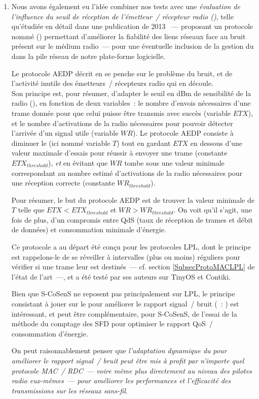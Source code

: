 \begin{enumerate}
\item Nous avons également eu l'idée combiner nos tests avec une
\emph{évaluation de l'influence du seuil de réception de l'émetteur~/
récepteur radio ()}, telle qu'étudiée en détail
dans une publication de 2013 \cite{CCAThresholdStudy}~--- proposant un
protocole nommé  ()
permettant d'améliorer la fiabilité des liens réseaux face au bruit
présent sur le médium radio~--- pour une éventuelle inclusion de la
gestion du  dans la pile réseau de notre
plate-forme logicielle.

Le protocole AEDP décrit en \cite{CCAThresholdStudy} se penche sur
le problème du bruit, et de l'activité inutile des émetteurs~/ récepteurs
radio qui en découle.\\
Son principe est, pour résumer, d'adapter le seuil en dBm de sensibilité
de la radio (), en fonction de deux variables~:
le nombre d'envois nécessaires d'une trame donnée pour que celui puisse
être transmis avec succès (variable ${ETX}$), et le nombre d'activations
de la radio nécessaires pour pouvoir détecter l'arrivée d'un signal utile
(variable ${WR}$). Le protocole AEDP consiste à diminuer le  (ici nommé variable $T$) tout en gardant $ETX$ en dessous
d'une valeur maximale d'essais pour réussir à envoyer une trame (constante
${ETX}_{threshold}$), \emph{et} en évitant que $WR$ tombe sous une valeur
minimale correspondant au nombre estimé d'activations de la radio nécessaires
pour une réception correcte (constante ${WR}_{threshold}$).

Pour résumer, le but du protocole AEDP est de trouver la valeur minimale
de $T$ telle que ${ETX} < {ETX}_{threshold}$ et ${WR} > {WR}_{threshold}$.
On voit qu'il s'agit, une fois de plus, d'un compromis entre QdS (taux
de réception de trames et débit de données) et consommation minimale
d'énergie.

Ce protocole a au départ été conçu pour les protocoles LPL, dont le principe
est rappelons-le de se réveiller à intervalles (plus ou moins) réguliers
pour vérifier si une trame leur est destinés~--- cf. section
\vref{SubsecProtoMACLPL} de l'état de l'art~---, et a été testé
par ses auteurs sur TinyOS et Contiki.

Bien que S-CoSenS ne reposent pas principalement sur LPL, le principe
consistant à jouer sur le  pour améliorer le
rapport signal~/ bruit (~: ) est
intéressant, et peut être complémentaire, pour S-CoSenS, de l'essai
de la méthode du comptage des SFD pour optimiser le rapport QoS~/
consommation d'énergie.

On peut raisonnablement penser que \emph{l'adaptation dynamique du
 pour améliorer le rapport signal~/ bruit peut être
mis à profit par n'importe quel protocole MAC~/ RDC~--- voire même plus
directement au niveau des pilotes radio eux-mêmes~--- pour améliorer les
performances et l'efficacité des transmissions sur les réseaux sans-fil}.

\end{enumerate}


